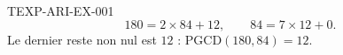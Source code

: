 \begin{corrige}{TEXP-ARI-EX-001}
\[
  180 = 2\times84+12, \qquad 84=7\times12+0.
\]
Le dernier reste non nul est $12$ : $\mathrm{PGCD}(180,84)=12$.
\end{corrige}

